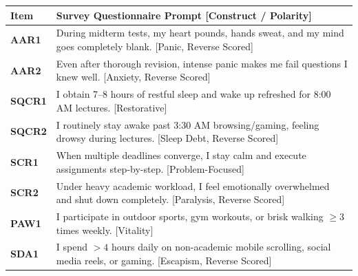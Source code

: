 \documentclass[aspectratio=169, 10pt]{beamer}
\begin{document}
\begin{frame}
  \begin{columns}[T]
    \begin{column}{0.495\textwidth}
      \begin{tcolorbox}[colback=white, colframe=BlueDeep, arc=1.5mm, boxrule=0.8pt, top=0.3mm, bottom=0.3mm, left=0.8mm, right=0.8mm, title={\scriptsize\bfseries\color{white}Quadrant 3: Somatic Health \& Affective Balance}, colbacktitle=BlueDeep]
        \fontsize{4.5pt}{5.4pt}\selectfont
        \renewcommand{\arraystretch}{0.80}
        \begin{tabularx}{\linewidth}{@{}l X@{}}
          \toprule
          \textbf{Item} & \textbf{Survey Questionnaire Prompt [Construct / Polarity]} \\
          \midrule
          \rowcolor{BlueLight} \textbf{AAR1} & During midterm tests, my heart pounds, hands sweat, and my mind goes completely blank. [Panic, Reverse Scored] \\
          \rowcolor{BlueLight} \textbf{AAR2} & Even after thorough revision, intense panic makes me fail questions I knew well. [Anxiety, Reverse Scored] \\
          \midrule
          \rowcolor{CanvasBG} \textbf{SQCR1} & I obtain 7--8 hours of restful sleep and wake up refreshed for 8:00 AM lectures. [Restorative] \\
          \rowcolor{CanvasBG} \textbf{SQCR2} & I routinely stay awake past 3:30 AM browsing/gaming, feeling drowsy during lectures. [Sleep Debt, Reverse Scored] \\
          \midrule
          \rowcolor{BlueLight} \textbf{SCR1} & When multiple deadlines converge, I stay calm and execute assignments step-by-step. [Problem-Focused] \\
          \rowcolor{BlueLight} \textbf{SCR2} & Under heavy academic workload, I feel emotionally overwhelmed and shut down completely. [Paralysis, Reverse Scored] \\
          \midrule
          \rowcolor{CanvasBG} \textbf{PAW1} & I participate in outdoor sports, gym workouts, or brisk walking $\ge 3$ times weekly. [Vitality] \\
          \midrule
          \rowcolor{BlueLight} \textbf{SDA1} & I spend $> 4$ hours daily on non-academic mobile scrolling, social media reels, or gaming. [Escapism, Reverse Scored] \\
          \bottomrule
        \end{tabularx}
      \end{tcolorbox}
    \end{column}

\end{columns}
\end{frame}
\end{document}
